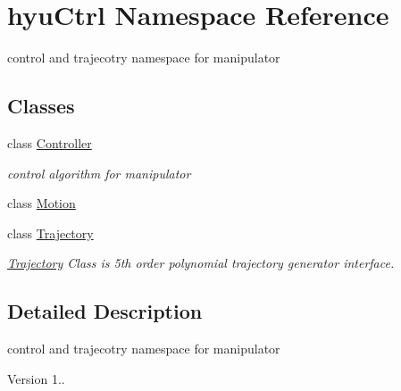\hypertarget{namespacehyu_ctrl}{}\section{hyu\+Ctrl Namespace Reference}
\label{namespacehyu_ctrl}


control and trajecotry namespace for manipulator  


\subsection*{Classes}
\begin{DoxyCompactItemize}
\item 
class \hyperlink{classhyu_ctrl_1_1_controller}{Controller}
\begin{DoxyCompactList}\small\item\em control algorithm for manipulator \end{DoxyCompactList}\item 
class \hyperlink{classhyu_ctrl_1_1_motion}{Motion}
\item 
class \hyperlink{classhyu_ctrl_1_1_trajectory}{Trajectory}
\begin{DoxyCompactList}\small\item\em \hyperlink{classhyu_ctrl_1_1_trajectory}{Trajectory} Class is 5th order polynomial trajectory generator interface. \end{DoxyCompactList}\end{DoxyCompactItemize}


\subsection{Detailed Description}
control and trajecotry namespace for manipulator 

\begin{DoxyVersion}{Version}
1.. 
\end{DoxyVersion}
